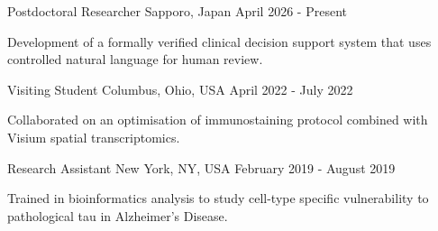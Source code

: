 %
%
%

\vspace*{0.4cm}

\begin{cventries}

    {Postdoctoral Researcher}
    {Sapporo, Japan}
    {April 2026 - Present}
    {\begin{cvitems}
        \item Development of a formally verified clinical decision support system that uses controlled natural language for human review.
    \end{cvitems}\vspace{1.5\baselineskip}}

    \vspace*{0.1cm}

    {Visiting Student}
    {Columbus, Ohio, USA}
    {April 2022 - July 2022}
    {\begin{cvitems}
        \item Collaborated on an optimisation of immunostaining protocol combined with Visium spatial transcriptomics.
    \end{cvitems}\vspace{1.5\baselineskip}}

    \vspace*{0.1cm}

    {Research Assistant}
    {New York, NY, USA}
    {February 2019 - August 2019}
    {\begin{cvitems}
        \item Trained in bioinformatics analysis to study cell-type specific vulnerability to pathological tau in Alzheimer's Disease.
    \end{cvitems}\vspace{1.5\baselineskip}}


\end{cventries}
